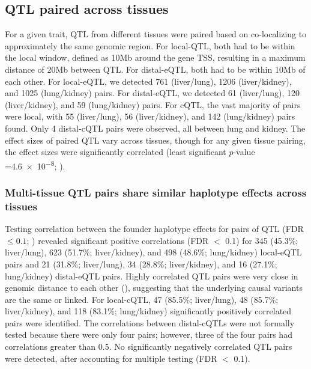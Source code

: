 \documentclass[10pt,letterpaper]{article}
\begin{document}
\subsection*{QTL paired across tissues}

For a given trait, QTL from different tissues were paired based on co-localizing to approximately the same genomic region. For local-QTL, both had to be within the local window, defined as 10Mb around the gene TSS, resulting in a maximum distance of 20Mb between QTL. For distal-eQTL, both had to be within 10Mb of each other. 
For local-eQTL, we detected 761 (liver/lung), 1206 (liver/kidney), and 1025 (lung/kidney) pairs. For distal-eQTL, we detected 61 (liver/lung), 120 (liver/kidney), and 59 (lung/kidney) pairs. For cQTL, the vast majority of pairs were local, with 55 (liver/lung), 56 (liver/kidney), and 142 (lung/kidney) pairs found. Only 4 distal-cQTL pairs were observed, all between lung and kidney. The effect sizes of paired QTL vary across tissues, though for any given tissue pairing, the effect sizes were significantly correlated (least significant $p$-value =\num{4.6e-8}; ).

\subsubsection*{Multi-tissue QTL pairs share similar haplotype effects across tissues}
Testing correlation between the founder haplotype effects for pairs of QTL (FDR $\le 0.1$; ) revealed significant positive correlations (FDR $<$ 0.1) for 345 (45.3\%; liver/lung), 623 (51.7\%; liver/kidney), and 498 (48.6\%; lung/kidney) local-eQTL pairs and 21 (31.8\%; liver/lung), 34 (28.8\%; liver/kidney), and 16 (27.1\%; lung/kidney) distal-eQTL pairs. Highly correlated QTL pairs were very close in genomic distance to each other (), suggesting that the underlying causal variants are the same or linked. For local-cQTL, 47 (85.5\%; liver/lung), 48 (85.7\%; liver/kidney), and 118 (83.1\%; lung/kidney) significantly positively correlated pairs were identified. The correlations between distal-cQTLs were not formally tested because there were only four pairs; however, three of the four pairs had correlations greater than 0.5. No significantly negatively correlated QTL pairs were detected, after accounting for multiple testing (FDR $<$ 0.1).
\end{document}
